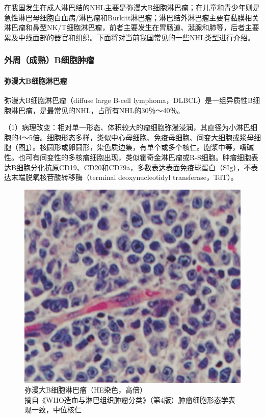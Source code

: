 在我国发生在成人淋巴结的NHL主要是弥漫大B细胞淋巴瘤；在儿童和青少年则是急性淋巴母细胞白血病/淋巴瘤和Burkitt淋巴瘤；淋巴结外淋巴瘤主要有黏膜相关淋巴瘤和鼻型NK/T细胞淋巴瘤，前者主要发生在胃肠道、涎腺和肺等，后者主要累及中线面部的器官和组织。下面将对当前我国常见的一些NHL类型进行介绍。

\subsubsection{外周（成熟）B细胞肿瘤}

\paragraph{弥漫大B细胞淋巴瘤}
弥漫大B细胞淋巴瘤（diffuse large B-cell
lymphoma，DLBCL）是一组异质性B细胞淋巴瘤，是最常见的NHL，占所有NHL的30％～40％。

（1）病理改变：相对单一形态、体积较大的瘤细胞弥漫浸润，其直径为小淋巴细胞的4～5倍。细胞形态多样，类似中心母细胞、免疫母细胞、间变大细胞或浆母细胞（图\ref{fig9-2}）。核圆形或卵圆形，染色质边集，有单个或多个核仁。胞浆中等，嗜碱性。也可有间变性的多核瘤细胞出现，类似霍奇金淋巴瘤或R-S细胞。肿瘤细胞表达B细胞分化抗原CD19、CD20和CD79a，多数表达表面免疫球蛋白（SIg），不表达末端脱氧核苷酸转移酶（terminal
deoxynucleotidyl transferase，TdT）。

\begin{figure}[!htbp]
 \centering
 \includegraphics{./images/Image00143.jpg}
 \captionsetup{justification=centering}
 \caption{弥漫大B细胞淋巴瘤（HE染色，高倍）\\ {\small 摘自《WHO造血与淋巴组织肿瘤分类》（第4版）肿瘤细胞形态学表现一致，中位核仁}}
\label{fig9-2}
  \end{figure}

